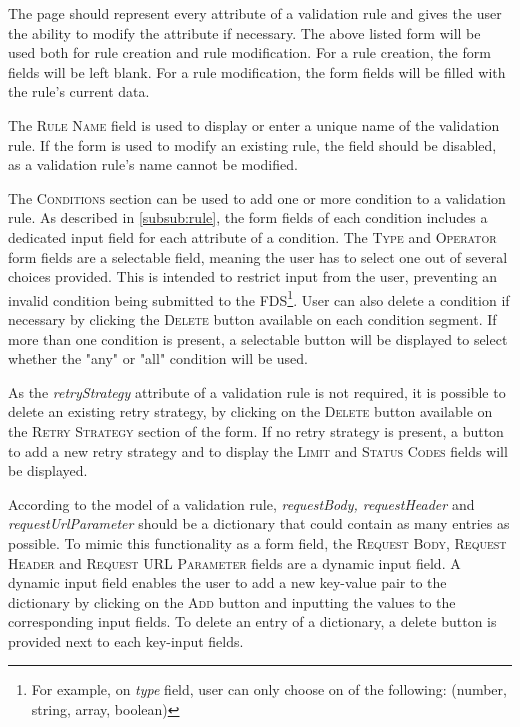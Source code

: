 The page should represent every attribute of a validation rule and gives the user the ability to modify the attribute if necessary. The above listed form will be used both for rule creation and rule modification. For a rule creation, the form fields will be left blank. For a rule modification, the form fields will be filled with the rule's current data. 

The \textsc{Rule Name} field is used to display or enter a unique name of the validation rule. If the form is used to modify an existing rule, the field should be disabled, as a validation rule's name cannot be modified. 

The \textsc{Conditions} section can be used to add one or more condition to a validation rule. As described in \autoref{subsub:rule}, the form fields of each condition includes a dedicated input field for each attribute of a condition. The \textsc{Type} and \textsc{Operator} form fields are a selectable field, meaning the user has to select one out of several choices provided. This is intended to restrict input from the user, preventing an invalid condition being submitted to the FDS\footnote{For example, on \emph{type} field, user can only choose on of the following: (number, string, array, boolean)}. User can also delete a condition if necessary by clicking the \textsc{Delete} button available on each condition segment. If more than one condition is present, a selectable button will be displayed to select whether the "any" or "all" condition will be used. 

As the \emph{retryStrategy} attribute of a validation rule is not required, it is possible to delete an existing retry strategy, by clicking on the \textsc{Delete} button available on the \textsc{Retry Strategy} section of the form. If no retry strategy is present, a button to add a new retry strategy and to display the \textsc{Limit} and \textsc{Status Codes} fields will be displayed.

According to the model of a validation rule, \emph{requestBody, requestHeader} and \emph{requestUrlParameter} should be a dictionary that could contain as many entries as possible. To mimic this functionality as a form field, the \textsc{Request Body, Request Header} and \textsc{Request URL Parameter} fields are a dynamic input field. A dynamic input field enables the user to add a new key-value pair to the dictionary by clicking on the \textsc{Add} button and inputting the values to the corresponding input fields. To delete an entry of a dictionary, a delete button is provided next to each key-input fields. 


